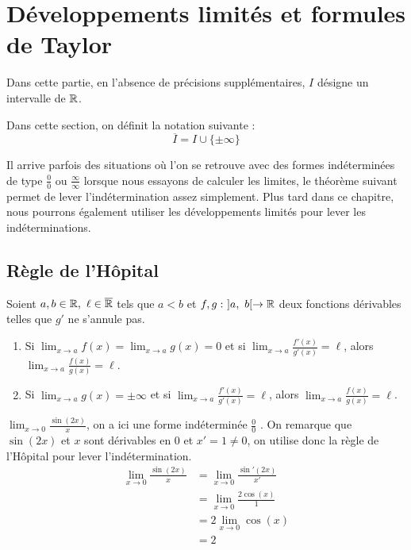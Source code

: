 \chapter{Développements limités et formules de Taylor}
\def\arraystretch{1}

Dans cette partie, en l'absence de précisions supplémentaires, $I$ désigne un intervalle de $\mathbb{R}$.

\begin{notation}
    Dans cette section, on définit la notation suivante : 
    \[ \overline{I} = I \cup \{\pm \infty\} \]
\end{notation}

\par Il arrive parfois des situations où l'on se retrouve avec des formes indéterminées de type \og $\frac{0}{0}$ \fg ou \og $\frac{\infty}{\infty}$ \fg lorsque nous essayons de calculer les limites, le théorème suivant permet de lever l'indétermination assez simplement.
Plus tard dans ce chapitre, nous pourrons également utiliser les développements limités pour lever les indéterminations.
\section{Règle de l'Hôpital}
\begin{theorem}
    Soient $a, b \in \mathbb{R},\ \ell \in \overline{\mathbb{R}}$ tels que $a < b$ et $f, g : \ ]a,\ b[ \to \mathbb{R}$ deux fonctions dérivables telles que $g'$ ne s'annule pas. 
    \begin{enumerate}
        \item Si $\lim_{x \to a} f(x) = \lim_{x \to a} g(x) = 0$ et si $\lim_{x \to a} \frac{f'(x)}{g'(x)} = \ell$, alors $\lim_{x \to a} \frac{f(x)}{g(x)} = \ell$.
        \item Si $\lim_{x \to a} g(x) = \pm \infty$ et si $\lim_{x \to a} \frac{f'(x)}{g'(x)} = \ell$, alors $\lim_{x \to a} \frac{f(x)}{g(x)} = \ell$.
    \end{enumerate}
\end{theorem}


\begin{example}
    $\lim_{x \to 0} \frac{\sin(2x)}{x}$, on a ici une forme indéterminée \og $\frac{0}{0}$ \fg.
    On remarque que $\sin(2x)$ et $x$ sont dérivables en 0 et $x' = 1 \neq 0$, on utilise donc la règle de l'Hôpital pour lever l'indétermination.
    \begin{align*}
        \lim_{x \to 0} \frac{\sin(2x)}{x} &= \lim_{x \to 0} \frac{\sin'(2x)}{x'} \\
        &= \lim_{x \to 0} \frac{2 \cos(x)}{1} \\
        &= 2 \lim_{x \to 0} \cos(x) \\
        &= 2
    \end{align*}
\end{example}

